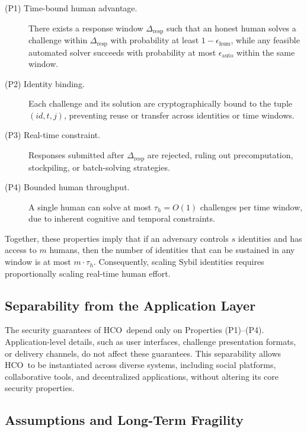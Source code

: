\documentclass[11pt]{article}
\newcommand{\HCO}{HCO\xspace}
\begin{document}
\begin{description}
	\item[(P1) Time-bound human advantage.]
	There exists a response window $\Delta_{\mathrm{resp}}$ such that an honest human solves a challenge within $\Delta_{\mathrm{resp}}$ with probability at least $1-\epsilon_{\mathrm{hum}}$, while any feasible automated solver succeeds with probability at most $\epsilon_{\mathrm{auto}}$ within the same window.
	
	\item[(P2) Identity binding.]
	Each challenge and its solution are cryptographically bound to the tuple $(id, t, j)$, preventing reuse or transfer across identities or time windows.
	
	\item[(P3) Real-time constraint.]
	Responses submitted after $\Delta_{\mathrm{resp}}$ are rejected, ruling out precomputation, stockpiling, or batch-solving strategies.
	
	\item[(P4) Bounded human throughput.]
	A single human can solve at most $\tau_h = O(1)$ challenges per time window, due to inherent cognitive and temporal constraints.
\end{description}

\noindent
Together, these properties imply that if an adversary controls $s$ identities and has access to $m$ humans, then the number of identities that can be sustained in any window is at most $m \cdot \tau_h$. Consequently, scaling Sybil identities requires proportionally scaling real-time human effort.

\subsection{Separability from the Application Layer}

The security guarantees of \HCO\ depend only on Properties (P1)--(P4). Application-level details, such as user interfaces,
challenge presentation formats, or delivery channels, do not affect
 these guarantees. This separability allows \HCO\ to be instantiated across diverse systems, including social platforms, collaborative tools, and decentralized applications, without altering its core security properties.

\subsection{Assumptions and Long-Term Fragility}
\end{document}
